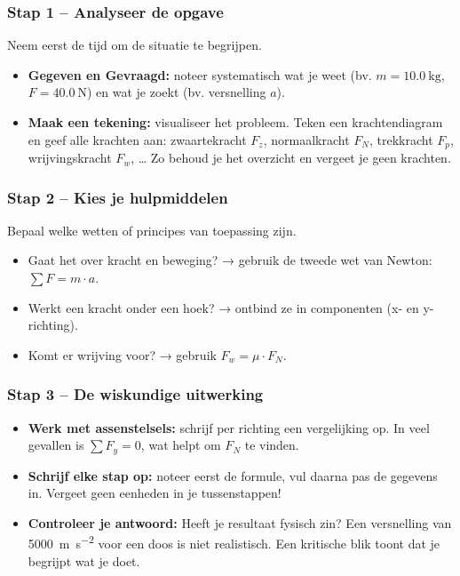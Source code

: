 \documentclass{ximera}
\begin{document}
\subsubsection{Stap 1 – Analyseer de opgave}
Neem eerst de tijd om de situatie te begrijpen.
\begin{itemize}
  \item \textbf{Gegeven en Gevraagd:} noteer systematisch wat je weet (bv. $m=\qty{10,0}{\kilogram}$, $F=\qty{40,0}{\newton}$) en wat je zoekt (bv. versnelling $a$).
  \item \textbf{Maak een tekening:} visualiseer het probleem.  
  Teken een krachtendiagram en geef alle krachten aan: zwaartekracht $F_z$, normaalkracht $F_N$, trekkracht $F_p$, wrijvingskracht $F_w$, …  
  Zo behoud je het overzicht en vergeet je geen krachten.
\end{itemize}

\subsubsection{Stap 2 – Kies je hulpmiddelen}
Bepaal welke wetten of principes van toepassing zijn.
\begin{itemize}
  \item Gaat het over kracht en beweging? → gebruik de tweede wet van Newton: $\sum F = m \cdot a$.
  \item Werkt een kracht onder een hoek? → ontbind ze in componenten (x- en y-richting).
  \item Komt er wrijving voor? → gebruik $F_w = \mu \cdot F_N$.
\end{itemize}

\subsubsection{Stap 3 – De wiskundige uitwerking}
\begin{itemize}
  \item \textbf{Werk met assenstelsels:} schrijf per richting een vergelijking op. In veel gevallen is $\sum F_y = 0$, wat helpt om $F_N$ te vinden.
  \item \textbf{Schrijf elke stap op:} noteer eerst de formule, vul daarna pas de gegevens in. Vergeet geen eenheden in je tussenstappen!
  \item \textbf{Controleer je antwoord:}  
  Heeft je resultaat fysisch zin? Een versnelling van \qty{5000}{\metre\per\second\squared} voor een doos is niet realistisch.  
  Een kritische blik toont dat je begrijpt wat je doet.
\end{itemize}
\end{document}

